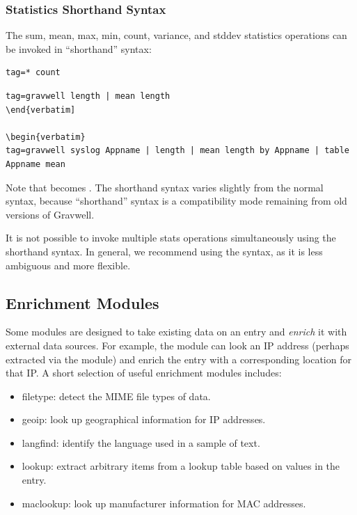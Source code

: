 \subsubsection{Statistics Shorthand Syntax}

The sum, mean, max, min, count, variance, and stddev statistics operations can be invoked in ``shorthand'' syntax:

\begin{verbatim}
tag=* count
\end{verbatim}

\begin{verbatim}
tag=gravwell length | mean length
\end{verbatim]

\begin{verbatim}
tag=gravwell syslog Appname | length | mean length by Appname | table Appname mean
\end{verbatim}

Note that  becomes . The shorthand syntax varies slightly from the normal syntax, because ``shorthand'' syntax is a compatibility mode remaining from old versions of Gravwell.

It is not possible to invoke multiple stats operations simultaneously using the shorthand syntax. In general, we recommend using the  syntax, as it is less ambiguous and more flexible.

\clearpage
\subsection{Enrichment Modules}

Some modules are designed to take existing data on an entry and \emph{enrich} it with external data sources. For example, the  module can look an IP address (perhaps extracted via the  module) and enrich the entry with a corresponding location for that IP. A short selection of useful enrichment modules includes:

\begin{itemize}
\item filetype: detect the MIME file types of data.
\item geoip: look up geographical information for IP addresses.
\item langfind: identify the language used in a sample of text.
\item lookup: extract arbitrary items from a lookup table based on values in the entry.
\item maclookup: look up manufacturer information for MAC addresses.
\end{itemize}

